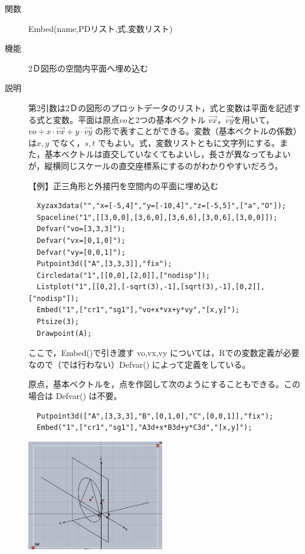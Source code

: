 \documentclass[papersize,a4paper,12pt,uplatex]{jsarticle}
\begin{document}
\begin{description}
\hypertarget{embed}{}
\item[関数]  Embed(name,PDリスト,式,変数リスト)
\item[機能]  2Ｄ図形の空間内平面へ埋め込む
\item[説明]  第2引数は2Ｄの図形のプロットデータのリスト，式と変数は平面を記述する式と変数。平面は原点$vo$と2つの基本ベクトル $\overrightarrow{vx}，\overrightarrow{vy}$を用いて，$vo+x \cdot \overrightarrow{vx}+y \cdot \overrightarrow{vy}$ の形で表すことができる。変数（基本ベクトルの係数）は$x,y$ でなく，$s,t$ でもよい。式，変数リストともに文字列にする。また，基本ベクトルは直交していなくてもよいし，長さが異なってもよいが，縦横同じスケールの直交座標系にするのがわかりやすいだろう。

\vspace{\baselineskip}
【例】正三角形と外接円を空間内の平面に埋め込む
\begin{verbatim}
  Xyzax3data("","x=[-5,4]","y=[-10,4]","z=[-5,5]",["a","O"]);
  Spaceline("1",[[3,0,0],[3,6,0],[3,6,6],[3,0,6],[3,0,0]]);
  Defvar("vo=[3,3,3]");
  Defvar("vx=[0,1,0]");
  Defvar("vy=[0,0,1]");
  Putpoint3d(["A",[3,3,3]],"fix");
  Circledata("1",[[0,0],[2,0]],["nodisp"]);
  Listplot("1",[[0,2],[-sqrt(3),-1],[sqrt(3),-1],[0,2]],["nodisp"]);
  Embed("1",["cr1","sg1"],"vo+x*vx+y*vy","[x,y]");
  Ptsize(3);
  Drawpoint(A);
\end{verbatim}
         \begin{center}  \end{center}

ここで，Embed()で引き渡す vo,vx,vy については，Rでの変数定義が必要なので（\ketcindy では行わない）Defvar() によって定義をしている。

原点，基本ベクトルを，点を作図して次のようにすることもできる。この場合は Defvar() は不要。

\begin{verbatim}
  Putpoint3d(["A",[3,3,3],"B",[0,1,0],"C",[0,0,1]],"fix");
  Embed("1",["cr1","sg1"],"A3d+x*B3d+y*C3d","[x,y]");
\end{verbatim}
\begin{center}
\includegraphics[bb=0 0 477.02 383.02 , width=6cm]{Fig/embed03.pdf}
\end{center}


\end{description}
\end{document}

